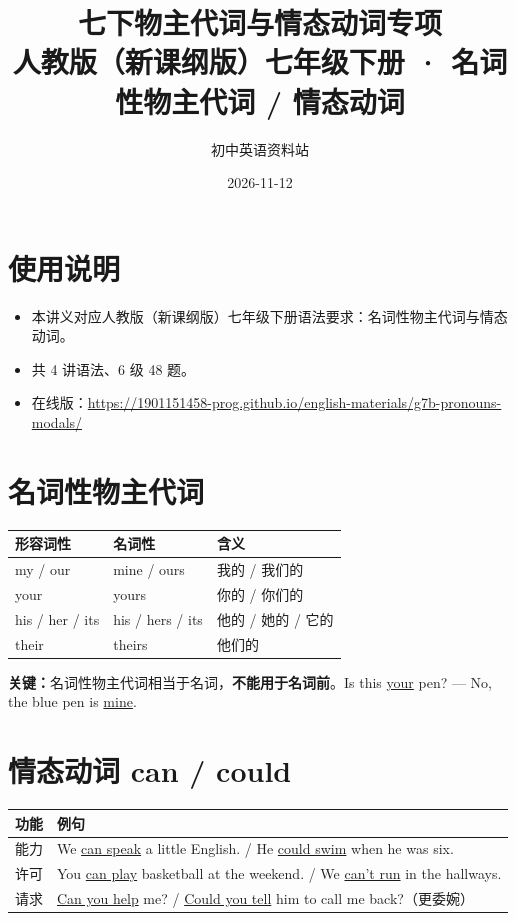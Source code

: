 \documentclass[11pt,a4paper]{ctexart}
\title{\textbf{七下物主代词与情态动词专项}\\[4pt]
\large 人教版（新课纲版）七年级下册 · 名词性物主代词 / 情态动词}
\author{初中英语资料站}
\date{2026-11-12}
\begin{document}
\maketitle

\section*{使用说明}
\begin{itemize}[leftmargin=1.4em]
\item 本讲义对应人教版（新课纲版）七年级下册语法要求：名词性物主代词与情态动词。
\item 共 4 讲语法、6 级 48 题。
\item 在线版：\url{https://1901151458-prog.github.io/english-materials/g7b-pronouns-modals/}
\end{itemize}

\section{名词性物主代词}
\begin{center}
\begin{tabular}{p{4.2cm}p{4.2cm}p{4.0cm}}
\hline
\textbf{形容词性} & \textbf{名词性} & \textbf{含义}\\
\hline
my / our & mine / ours & 我的 / 我们的\\
your & yours & 你的 / 你们的\\
his / her / its & his / hers / its & 他的 / 她的 / 它的\\
their & theirs & 他们的\\
\hline
\end{tabular}
\end{center}
\textbf{关键：}名词性物主代词相当于名词，\textbf{不能用于名词前}。Is this \underline{your} pen? --- No, the blue pen is \underline{mine}.

\section{情态动词 can / could}
\begin{center}
\begin{tabular}{p{2.6cm}p{9.8cm}}
\hline
\textbf{功能} & \textbf{例句}\\
\hline
能力 & We \underline{can speak} a little English. / He \underline{could swim} when he was six.\\
许可 & You \underline{can play} basketball at the weekend. / We \underline{can't run} in the hallways.\\
请求 & \underline{Can you help} me? / \underline{Could you tell} him to call me back?（更委婉）\\
\hline
\end{tabular}
\end{center}
\end{document}
